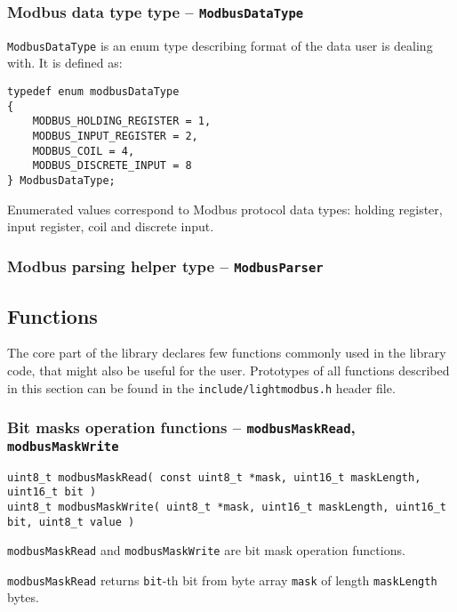 \documentclass[11pt,a4paper]{article}
\begin{document}
\subsubsection{Modbus data type type -- \texttt{ModbusDataType}} \label{sec:ModbusDataType}
\texttt{ModbusDataType} is an enum type describing format of the data user is dealing with.
It is defined as:

\begin{lstlisting}
typedef enum modbusDataType
{
	MODBUS_HOLDING_REGISTER = 1,
	MODBUS_INPUT_REGISTER = 2,
	MODBUS_COIL = 4,
	MODBUS_DISCRETE_INPUT = 8
} ModbusDataType;
\end{lstlisting}

Enumerated values correspond to Modbus protocol data types: holding register, input register, coil and discrete input. 


\subsubsection{Modbus parsing helper type -- \texttt{ModbusParser}} \label{sec:ModbusParser}

\subsection{Functions}
The core part of the library declares few functions commonly used in the library code, that might also be useful for the user. Prototypes of all functions described in this section can be found in the \texttt{include/lightmodbus.h} header file.


\subsubsection{Bit masks operation functions -- \texttt{modbusMaskRead}, \texttt{modbusMaskWrite}}
\begin{lstlisting}[style=cproto]
uint8_t modbusMaskRead( const uint8_t *mask, uint16_t maskLength, uint16_t bit )
uint8_t modbusMaskWrite( uint8_t *mask, uint16_t maskLength, uint16_t bit, uint8_t value )
\end{lstlisting}

\texttt{modbusMaskRead} and \texttt{modbusMaskWrite} are bit mask operation functions.\newline 

\texttt{modbusMaskRead} returns \texttt{bit}-th bit from byte array \texttt{mask} of length \texttt{maskLength} bytes.  \newline
\end{document}
